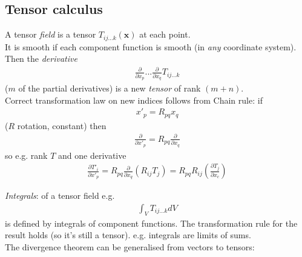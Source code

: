 \documentclass[a4paper]{article}
\begin{document}
\subsection{Tensor calculus}
A tensor \emph{field} is a tensor $T_{ij...k} \left(\mathbf{x}\right)$ at each point.\\
It is smooth if each component function is smooth (in \emph{any} coordinate system).\\
Then the \emph{derivative}
\begin{equation*}
\begin{aligned}
\frac{\partial}{\partial x_p}...\frac{\partial}{\partial x_q} T_{ij...k}
\end{aligned}
\end{equation*}
($m$ of the partial derivatives) is a new \emph{tensor} of rank $\left(m+n\right)$.\\
Correct transformation law on new indices follows from Chain rule: if
\begin{equation*}
\begin{aligned}
x'_p = R_{pq}x_q
\end{aligned}
\end{equation*}
($R$ rotation, constant) then
\begin{equation*}
\begin{aligned}
\frac{\partial}{\partial x'_p} = R_{pq} \frac{\partial}{\partial x_q}
\end{aligned}
\end{equation*}
so e.g. rank $T$ and one derivative
\begin{equation*}
\begin{aligned}
\frac{\partial T'_i}{\partial x'_p} = R_{pq} \frac{\partial}{\partial x_q} \left(R_{ij}T_j\right) = R_{pq}R_{ij} \left(\frac{\partial T_j}{\partial x_c}\right)
\end{aligned}
\end{equation*}

\emph{Integrals}: of a tensor field e.g.
\begin{equation*}
\begin{aligned}
\int_V T_{ij...k} dV
\end{aligned}
\end{equation*}
is defined by integrals of component functions. The transformation rule for the result holds (so it's still a tensor). e.g. integrals are limits of sums.\\

The divergence theorem can be generalised from vectors to tensors:
\end{document}
